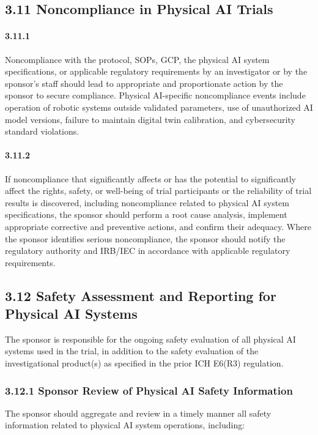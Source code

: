 \documentclass[11pt]{article}
\begin{document}
\subsection{3.11 Noncompliance in Physical AI Trials}

\paragraph{3.11.1} Noncompliance with the protocol, SOPs, GCP, the physical AI system specifications, or applicable regulatory requirements by an investigator or by the sponsor's staff should lead to appropriate and proportionate action by the sponsor to secure compliance. Physical AI-specific noncompliance events include operation of robotic systems outside validated parameters, use of unauthorized AI model versions, failure to maintain digital twin calibration, and cybersecurity standard violations.

\paragraph{3.11.2} If noncompliance that significantly affects or has the potential to significantly affect the rights, safety, or well-being of trial participants or the reliability of trial results is discovered, including noncompliance related to physical AI system specifications, the sponsor should perform a root cause analysis, implement appropriate corrective and preventive actions, and confirm their adequacy. Where the sponsor identifies serious noncompliance, the sponsor should notify the regulatory authority and IRB/IEC in accordance with applicable regulatory requirements.

\subsection{3.12 Safety Assessment and Reporting for Physical AI Systems}

The sponsor is responsible for the ongoing safety evaluation of all physical AI systems used in the trial, in addition to the safety evaluation of the investigational product(s) as specified in the prior ICH E6(R3) regulation.

\subsubsection{3.12.1 Sponsor Review of Physical AI Safety Information}

The sponsor should aggregate and review in a timely manner all safety information related to physical AI system operations, including:
\end{document}
